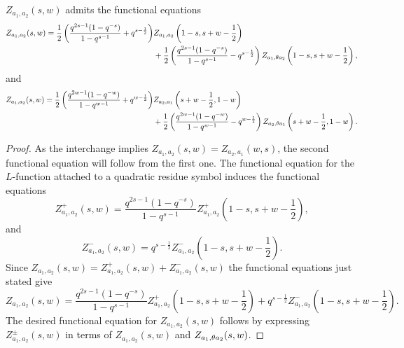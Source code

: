 \documentclass[12pt,reqno,oneside]{amsart}
\begin{document}
    \begin{theorem}\label{thm:double_Dirichlet_series_functional_equation}
        $Z_{a_{1},a_{2}}(s,w)$ admits the functional equations
        \begin{align*}
            Z_{a_{1},a_{2}}(s,w) = \frac{1}{2}\left(\frac{q^{2s-1}(1-q^{-s})}{1-q^{s-1}}+q^{s-\frac{1}{2}}\right)&Z_{a_{1},a_{2}}\left(1-s,s+w-\frac{1}{2}\right) \\
            &+\frac{1}{2}\left(\frac{q^{2s-1}(1-q^{-s})}{1-q^{s-1}}-q^{s-\frac{1}{2}}\right)Z_{a_{1},\theta a_{2}}\left(1-s,s+w-\frac{1}{2}\right),
        \end{align*}
        and
        \begin{align*}
            Z_{a_{1},a_{2}}(s,w) = \frac{1}{2}\left(\frac{q^{2w-1}(1-q^{-w})}{1-q^{w-1}}+q^{w-\frac{1}{2}}\right)&Z_{a_{2},a_{1}}\left(s+w-\frac{1}{2},1-w\right) \\
            &+\frac{1}{2}\left(\frac{q^{2w-1}(1-q^{-w})}{1-q^{w-1}}-q^{w-\frac{1}{2}}\right)Z_{a_{2},\theta a_{1}}\left(s+w-\frac{1}{2},1-w\right).
        \end{align*}
    \end{theorem}
    \begin{proof}
        As the interchange implies $Z_{a_{1},a_{2}}(s,w) = Z_{a_{2},a_{1}}(w,s)$, the second functional equation will follow from the first one. The functional equation for the $L$-function attached to a quadratic residue symbol induces the functional equations
        \[
            Z_{a_{1},a_{2}}^{+}(s,w) = \frac{q^{2s-1}(1-q^{-s})}{1-q^{s-1}}Z_{a_{1},a_{2}}^{+}\left(1-s,s+w-\frac{1}{2}\right),
        \]
        and
        \[
            Z_{a_{1},a_{2}}^{-}(s,w) = q^{s-\frac{1}{2}}Z_{a_{1},a_{2}}^{-}\left(1-s,s+w-\frac{1}{2}\right).
        \]
        Since $Z_{a_{1},a_{2}}(s,w) = Z_{a_{1},a_{2}}^{+}(s,w)+Z_{a_{1},a_{2}}^{-}(s,w)$ the functional equations just stated give
        \[
            Z_{a_{1},a_{2}}(s,w) = \frac{q^{2s-1}(1-q^{-s})}{1-q^{s-1}}Z_{a_{1},a_{2}}^{+}\left(1-s,s+w-\frac{1}{2}\right)+q^{s-\frac{1}{2}}Z_{a_{1},a_{2}}^{-}\left(1-s,s+w-\frac{1}{2}\right).
        \]
        The desired functional equation for $Z_{a_{1},a_{2}}(s,w)$ follows by expressing $Z_{a_{1},a_{2}}^{\pm}(s,w)$ in terms of $Z_{a_{1},a_{2}}(s,w)$ and $Z_{a_{1},\theta a_{2}}(s,w)$.
    \end{proof}
\end{document}
